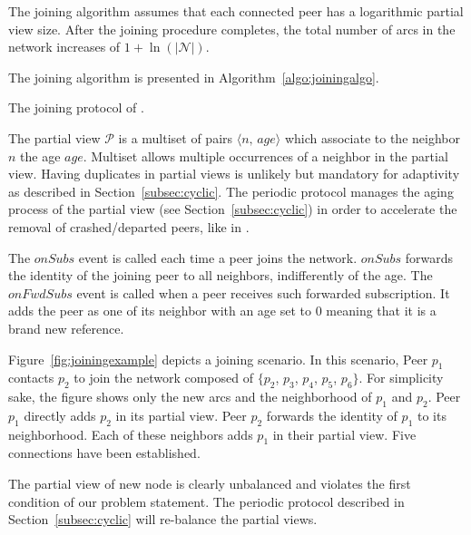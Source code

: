 The \SPRAY joining algorithm assumes that each connected peer has a
logarithmic partial view size. After the joining procedure completes,
the total number of arcs in the network increases of
$1+\ln(|\mathcal{N}|)$.


The \SPRAY joining algorithm is presented in
Algorithm~\ref{algo:joiningalgo}.

\begin{algorithm}

\caption{\label{algo:joiningalgo}The joining protocol of \SPRAY.}
\end{algorithm}

The partial view $\mathcal{P}$ is a multiset of pairs $\langle n,\, age\rangle$
which associate to the neighbor $n$ the age $age$. Multiset allows multiple
occurrences of a neighbor in the partial view. Having duplicates in partial
views is unlikely but mandatory for adaptivity as described in
Section~\ref{subsec:cyclic}. The periodic protocol manages the aging process of
the partial view (see Section~\ref{subsec:cyclic}) in order to accelerate the
removal of crashed/departed peers, like in \CYCLON.

The $onSubs$ event is called each time a peer joins the
network. $onSubs$ forwards the identity of the joining peer to all
neighbors, indifferently of the age. The $onFwdSubs$ event is called
when a peer receives such forwarded subscription. It adds the peer as
one of its neighbor with an age set to $0$ meaning that it is a brand
new reference.

Figure~\ref{fig:joiningexample} depicts a joining scenario. In this scenario,
Peer $p_1$ contacts $p_2$ to join the network composed of $\{p_2$, $p_3$,
$p_4$, $p_5$, $p_6\}$. For simplicity sake, the figure shows only the new arcs
and the neighborhood of $p_1$ and $p_2$. Peer $p_1$ directly adds $p_2$ in its
partial view. Peer $p_2$ forwards the identity of $p_1$ to its
neighborhood. Each of these neighbors adds $p_1$ in their partial view. Five
connections have been established.

The partial view of new node is clearly unbalanced and violates the
first condition of our problem statement. The periodic protocol
described in Section~\ref{subsec:cyclic} will re-balance the partial
views.

